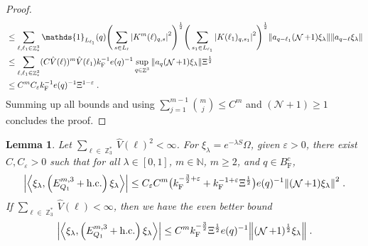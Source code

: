 \documentclass[12pt,a4paper]{article}
\numberwithin{equation}{section}
\newcommand{\cN}{\mathcal{N}}
\newcommand{\NNN}{\mathbb{N}}
\newcommand{\1}{\mathbb{I}}
\newcommand{\F}{\mathrm{F}}
\DeclareMathOperator{\Z}{\mathbb{Z}}
\DeclareMathOperator{\NN}{\mathcal{N}}
\newcommand{\half}{\frac{1}{2}}
\newcommand{\eva}[1]{\left\langle #1 \right\rangle}
\theoremstyle{plain}
\newtheorem{lemma}[theorem]{Lemma}
\theoremstyle{definition}
\theoremstyle{remark}
\theoremstyle{plain}
\theoremstyle{definition}
\theoremstyle{remark}
\begin{document}
\begin{proof}
{\begin{align}
	&\leq \sum_{\ell,\ell_1 \in \Z^3_*} \mathds{1}_{L_{\ell_1}}(q)
		\Bigg(\sum\limits_{s \in L_{\ell}} \abs{K^m(\ell)_{q,s}}^2\Bigg)^\half \Bigg(\sum\limits_{s_1 \in L_{\ell_1}} \abs{K(\ell_1)_{q,s_1}}^2\Bigg)^\half \norm{ a_{q-\ell_1} (\NN+1)\xi_\lambda} \norm{ a_{q-\ell}\xi_\lambda }\nonumber\\
	&\leq \sum_{\ell,\ell_1 \in \Z^3_*} (C \hat{V}(\ell))^m \hat{V}(\ell_1) k_{\F}^{-1} e(q)^{-1} \sup_{q \in \Z^3}\norm{ a_{q} (\NN+1) \xi_\lambda}\Xi^\half\nonumber\\
	&\leq C^m C_\varepsilon k_{\F}^{-1} e(q)^{-1} \Xi^{1-\varepsilon} \;. \label{eq:estEQ1113}
\end{align}
}
Summing up all bounds and using $\sum_{j=1}^{m-1} {{m}\choose j} \le C^m $ and $ (\cN+1) \ge 1 $ concludes the proof.
\end{proof}



\begin{lemma} \label{lem:EQ112}
Let $ \sum_{\ell \in \Z_3^*} \hat{V}(\ell)^2 < \infty $. For $\xi_\lambda = e^{-\lambda S} \Omega$, given $ \varepsilon > 0 $, there exist $ C, C_\varepsilon > 0 $ such that for all $ \lambda \in [0,1] $, $ m \in \NNN $, $ m \ge 2 $, and $ q \in B_{\F}^c $,
\begin{equation} \label{eq:estEQ112_Coulomb}
\begin{aligned}
	\abs{\eva{\xi_\lambda,\left(E^{m,3}_{Q_1}+\mathrm{h.c.}\right) \xi_\lambda }}\nonumber
	\leq C_\varepsilon C^m \big( k_{\F}^{-\frac 32 + \varepsilon}
		+ k_{\F}^{-1 + \varepsilon} \Xi^\half \big)
		e(q)^{-1}
		\norm{(\NN+1) \xi_\lambda }^2 \;.
\end{aligned}
\end{equation}
If $ \sum_{\ell \in \Z_3^*} \hat{V}(\ell) < \infty $, then we have the even better bound
\begin{equation} \label{eq:estEQ112}
\begin{aligned}
	\abs{\eva{\xi_\lambda,\left(E^{m,3}_{Q_1}+\mathrm{h.c.}\right) \xi_\lambda }}\nonumber
	\leq C^m k_{\F}^{-\frac{3}{2}} \Xi^{\half} e(q)^{-1}
		\norm{(\NN+1)^\half \xi_\lambda } \;.
\end{aligned}
\end{equation}
\end{lemma}
\end{document}

